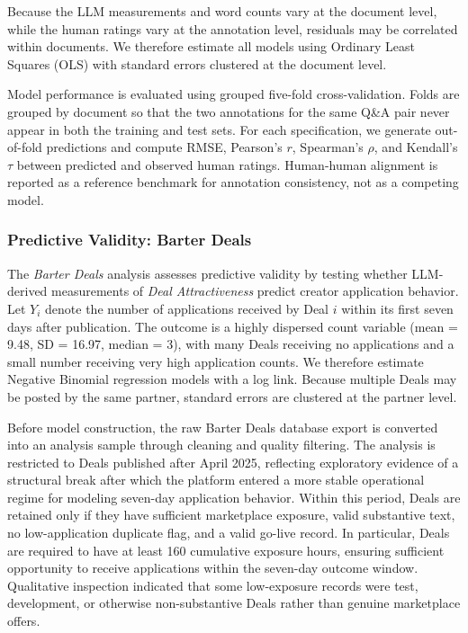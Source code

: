 Because the LLM measurements and word counts vary at the document level, while the human ratings vary at the annotation level, residuals may be correlated within documents. We therefore estimate all models using Ordinary Least Squares (OLS) with standard errors clustered at the document level.

Model performance is evaluated using grouped five-fold cross-validation. Folds are grouped by document so that the two annotations for the same Q\&A pair never appear in both the training and test sets. For each specification, we generate out-of-fold predictions and compute RMSE, Pearson's $r$, Spearman's $\rho$, and Kendall's $\tau$ between predicted and observed human ratings. Human-human alignment is reported as a reference benchmark for annotation consistency, not as a competing model.



\subsubsection{Predictive Validity: Barter Deals}\label{sec:methods_barter}

The \textit{Barter Deals} analysis assesses predictive validity by testing whether LLM-derived measurements of \textit{Deal Attractiveness} predict creator application behavior. Let $Y_i$ denote the number of applications received by Deal $i$ within its first seven days after publication. The outcome is a highly dispersed count variable (mean = 9.48, SD = 16.97, median = 3), with many Deals receiving no applications and a small number receiving very high application counts. We therefore estimate Negative Binomial regression models with a log link. Because multiple Deals may be posted by the same partner, standard errors are clustered at the partner level.

Before model construction, the raw Barter Deals database export is converted into an analysis sample through cleaning and quality filtering. The analysis is restricted to Deals published after April 2025, reflecting exploratory evidence of a structural break after which the platform entered a more stable operational regime for modeling seven-day application behavior. Within this period, Deals are retained only if they have sufficient marketplace exposure, valid substantive text, no low-application duplicate flag, and a valid go-live record. In particular, Deals are required to have at least 160 cumulative exposure hours, ensuring sufficient opportunity to receive applications within the seven-day outcome window. Qualitative inspection indicated that some low-exposure records were test, development, or otherwise non-substantive Deals rather than genuine marketplace offers.

